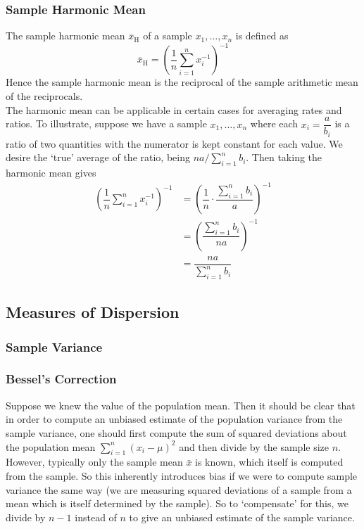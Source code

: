 \documentclass[11pt]{report} %
\begin{document}
\subsubsection{Sample Harmonic Mean}

The sample harmonic mean $\overline{x}_{\mathrm{H}}$ of a sample $x_{1}, \dots, x_{n}$ is defined as
\begin{equation}
\overline{x}_{\mathrm{H}} = \left(\dfrac{1}{n}\sum_{i = 1}^{n}x_{i}^{-1}\right)^{-1}
\end{equation}
Hence the sample harmonic mean is the reciprocal of the sample arithmetic mean of the reciprocals. \\

The harmonic mean can be applicable in certain cases for averaging rates and ratios. To illustrate, suppose we have a sample $x_{1}, \dots, x_{n}$ where each $x_{i} = \dfrac{a}{b_{i}}$ is a ratio of two quantities with the numerator is kept constant for each value. We desire the `true' average of the ratio, being $na/\sum_{i = 1}^{n}b_{i}$. Then taking the harmonic mean gives
\begin{align}
\left(\dfrac{1}{n}\sum_{i = 1}^{n}x_{i}^{-1}\right)^{-1} &= \left(\dfrac{1}{n}\cdot\dfrac{\sum_{i = 1}^{n}b_{i}}{a}\right)^{-1} \\
&= \left(\dfrac{\sum_{i = 1}^{n}b_{i}}{na}\right)^{-1} \\
&= \dfrac{na}{\sum_{i = 1}^{n}b_{i}}
\end{align}

\subsection{Measures of Dispersion}

\subsubsection{Sample Variance}

\subsubsection{Bessel's Correction}

Suppose we knew the value of the population mean. Then it should be clear that in order to compute an unbiased estimate of the population variance from the sample variance, one should first compute the sum of squared deviations about the population mean $\sum_{i = 1}^{n}{\left(x_{i} - \mu\right)^{2}}$ and then divide by the sample size $n$. However, typically only the sample mean $\bar{x}$ is known, which itself is computed from the sample. So this inherently introduces bias if we were to compute sample variance the same way (we are measuring squared deviations of a sample from a mean which is itself determined by the sample). So to `compensate' for this, we divide by $n - 1$ instead of $n$ to give an unbiased estimate of the sample variance.
\end{document}
